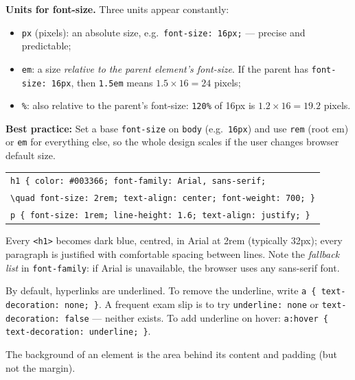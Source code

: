 \documentclass[11pt]{article}
\newcommand{\cle}[1]{{\popxbold\color{popdark}#1}}
\newcounter{popsec}
\newcounter{popsub}
\newcommand{\courssub}[1]{%
  \stepcounter{popsub}%
  \par\vspace{9pt}\noindent{\popxbold\fontsize{11.5}{13}\selectfont\color{popink}{\color{poporange}\thepopsec.\thepopsub}\hspace{6pt}#1}\par\nopagebreak\vspace{4pt}
}
\begin{document}
\textbf{Units for font-size.} Three units appear constantly:
\begin{itemize}
\item \texttt{px} (pixels): an absolute size, e.g.\ \texttt{font-size: 16px;} --- precise and predictable;
\item \texttt{em}: a size \emph{relative to the parent element's font-size}. If the parent has \texttt{font-size: 16px}, then \texttt{1.5em} means $1.5 \times 16 = 24$ pixels;
\item \texttt{\%}: also relative to the parent's font-size: \texttt{120\%} of 16px is $1.2 \times 16 = 19.2$ pixels.
\end{itemize}
\textbf{Best practice:} Set a base \texttt{font-size} on \texttt{body} (e.g.\ \texttt{16px}) and use \texttt{rem} (root em) or \texttt{em} for everything else, so the whole design scales if the user changes browser default size.

\begin{exemplebox}
\begin{center}
\begin{tabular}{l}
\texttt{h1 \{ color: \#003366; font-family: Arial, sans-serif;} \\
\texttt{\textbackslash{}quad font-size: 2rem; text-align: center; font-weight: 700; \}} \\
\texttt{p \{ font-size: 1rem; line-height: 1.6; text-align: justify; \}} \\
\end{tabular}
\end{center}
Every \texttt{<h1>} becomes dark blue, centred, in Arial at 2rem (typically 32px); every paragraph is justified with comfortable spacing between lines. Note the \emph{fallback list} in \texttt{font-family}: if Arial is unavailable, the browser uses any sans-serif font.
\end{exemplebox}

\begin{attention}
By default, hyperlinks are underlined. To remove the underline, write \texttt{a \{ text-decoration: none; \}}. A frequent exam slip is to try \texttt{underline: none} or \texttt{text-decoration: false} --- neither exists. To add underline on hover: \texttt{a:hover \{ text-decoration: underline; \}}.
\end{attention}

\courssub{Background Properties}

The \cle{background} of an element is the area behind its content and padding (but not the margin).
\end{document}
